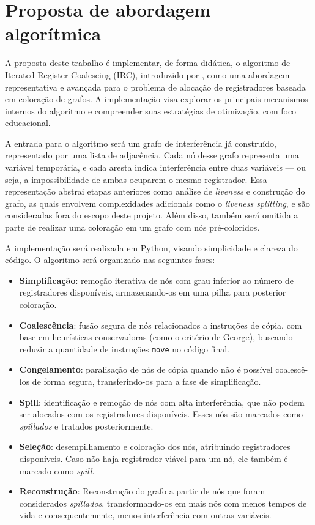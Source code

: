 \section{Proposta de abordagem algorítmica}

A proposta deste trabalho é implementar, de forma didática, o algoritmo de Iterated Register Coalescing (IRC),
introduzido por \textcite{irc}, como uma abordagem representativa e avançada para o problema de alocação de registradores
baseada em coloração de grafos. A implementação visa explorar os principais mecanismos internos do algoritmo e compreender
suas estratégias de otimização, com foco educacional.

A entrada para o algoritmo será um grafo de interferência já construído, representado por uma lista de adjacência. Cada nó
desse grafo representa uma variável temporária, e cada aresta indica interferência entre duas variáveis — ou seja, a impossibilidade
de ambas ocuparem o mesmo registrador. Essa representação abstrai etapas anteriores como análise de \textit{liveness} e
construção do grafo, as quais envolvem complexidades adicionais como o \textit{liveness splitting}, e são consideradas
fora do escopo deste projeto. Além disso, também será omitida a parte de realizar uma coloração em um grafo com nós pré-coloridos.

A implementação será realizada em Python, visando simplicidade e clareza do código. O algoritmo será organizado
nas seguintes fases:

\begin{itemize}
  \item \textbf{Simplificação}: remoção iterativa de nós com grau inferior ao número de registradores disponíveis,
    armazenando-os em uma pilha para posterior coloração.
  \item \textbf{Coalescência}: fusão segura de nós relacionados a instruções de cópia, com base em heurísticas conservadoras
    (como o critério de George), buscando reduzir a quantidade de instruções \texttt{move} no código final.
  \item \textbf{Congelamento}: paralisação de nós de cópia quando não é possível coalescê-los de forma segura, transferindo-os
    para a fase de simplificação.
  \item \textbf{Spill}: identificação e remoção de nós com alta interferência, que não podem ser alocados com os registradores
    disponíveis. Esses nós são marcados como \textit{spillados} e tratados posteriormente.
  \item \textbf{Seleção}: desempilhamento e coloração dos nós, atribuindo registradores disponíveis. Caso não haja registrador
    viável para um nó, ele também é marcado como \textit{spill}.
  \item \textbf{Reconstrução}: Reconstrução do grafo a partir de nós que foram considerados \textit{spillados}, transformando-os
    em mais nós com menos tempos de vida e consequentemente, menos interferência com outras variáveis. 
\end{itemize}

